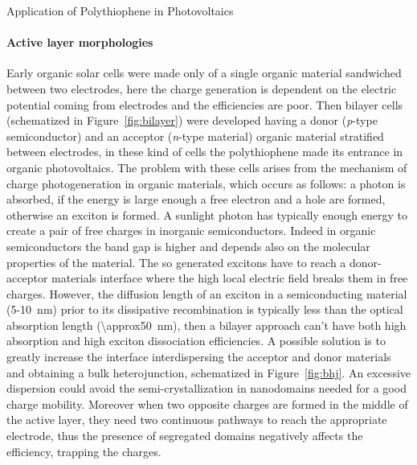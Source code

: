 \begin{section}{Application of Polythiophene in Photovoltaics}
\paragraph{Active layer morphologies} Early organic solar cells were made only of a single organic material sandwiched between two electrodes, here the charge generation is dependent on the electric potential coming from electrodes and the efficiencies are poor. 
Then bilayer cells (schematized in Figure~\ref{fig:bilayer}) were developed having a donor (\textit{p}-type semiconductor) and an acceptor (\textit{n}-type material) organic material stratified between electrodes, in these kind of cells the polythiophene made its entrance in organic photovoltaics. 
The problem with these cells arises from the mechanism of charge photo\-generation in organic materials, which occurs as follows: a photon is absorbed, if the energy is large enough a free electron and a hole are formed, otherwise an exciton 
is formed. 
A sunlight photon has typically enough energy to create a pair of free charges in inorganic semiconductors. Indeed in organic semiconductors the band gap 
is higher and depends also on the molecular properties of the material. The so generated excitons have to reach a donor-acceptor materials interface where the high local electric field breaks them in free charges. However, the diffusion length of an exciton in a semiconducting material (5-\SI{10}{\nm}) prior to its dissipative recombination is typically less than the optical absorption length (\SI{\approx50}{\nm}), then a bilayer approach can't have both high absorption and high exciton dissociation efficiencies. 
A possible solution is to greatly increase the interface inter\-dispersing the acceptor and donor materials and obtaining a bulk heterojunction, schematized in Figure~\ref{fig:bhj}. An excessive dispersion could avoid the semi-crystallization in nano\-domains needed for a good charge mobility. Moreover when two opposite charges are formed in the middle of the active layer, they need two continuous pathways to reach the appropriate electrode, thus the presence of segregated domains negatively affects the efficiency, trapping the charges.


\end{section}
